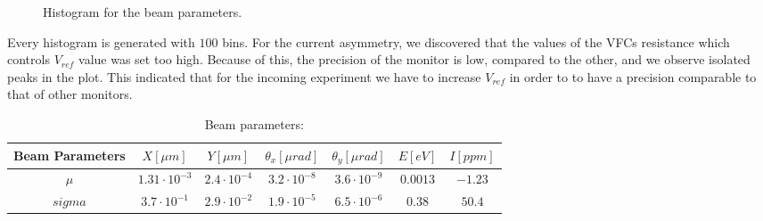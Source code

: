 \begin{figure}[!hbtp]
\caption{Histogram for the beam parameters.}
\label{fig:BeamParameters}
\end{figure}

Every histogram is generated with $100$ bins. For the current asymmetry, we discovered that the values of the VFCs resistance which controls $V_{ref}$ value was set too high. Because of this, the precision of the monitor is low, compared to the other, and we observe isolated peaks in the plot. This indicated that for the incoming experiment we have to increase $V_{ref}$ in order to to have a precision comparable to that of other monitors.

\begin{table}[hbtp]
\centering
\caption{Beam parameters:}
\begin{tabular}{c|c|c|c|c|c|c} 
\hline 
\rule[-1ex]{0pt}{2.5ex} 
Beam Parameters &  $X [\mu m]$ & $Y[\mu m]$ & $ \theta_{x} [\mu rad]$ & $ \theta_{y} [\mu rad]$ & $E [eV]$ & $I [ppm] $ \\ 
\hline 
\rule[-1ex]{0pt}{2.5ex} $\mu$ & $1.31 \cdot 10^{-3}$ & $2.4 \cdot 10^{-4}$ & $3.2 \cdot 10^{-8} $ & $3.6 \cdot 10^{-9}$ & $0.0013$ & $-1.23$ \\ 
\hline 
\rule[-1ex]{0pt}{2.5ex} $sigma$ & $3.7 \cdot 10^{-1}$ & $2.9 \cdot 10^{-2}$ & $ 1.9 \cdot 10^{-5} $ & $6.5 \cdot 10^{-6}$ & $0.38$  & $50.4$ \\ 
\hline 
\end{tabular}
\label{Tab:parametri} 
\end{table}

